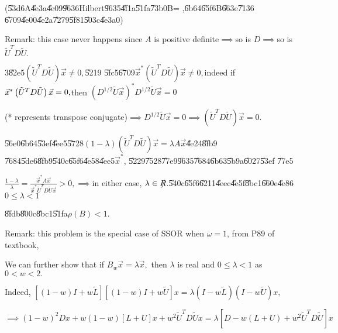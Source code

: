 \documentclass{article}
\begin{document}
(\U{53d6}A\U{4e3a}\U{4e09}\U{9636}Hilbert\U{9635}\U{4f1a}\U{51fa}\U{73b0}B=%
,\U{6b64}\U{65f6}B\U{663e}\U{7136}%
\U{6709}\U{4e00}\U{4e2a}\U{7279}\U{5f81}\U{503c}\U{4e3a}0)

Remark: this case never happens since $A$ is positive definite$\implies $so
is $D\implies $so is $\tilde{U}^{T}D\tilde{U}.$

3\U{82e5}$\left( \tilde{U}^{T}D\tilde{U}\right) \vec{x}\neq 0,$\U{5219}%
\U{5fc5}\U{6709}$\vec{x}^{\ast }\left( \tilde{U}^{T}D\tilde{U}\right) \vec{x}%
\neq 0,$indeed if $\vec{x}^{\ast }\left( \tilde{U}^{T}D\tilde{U}\right) \vec{%
x}=0,$then $\left( D^{1/2}\tilde{U}\vec{x}\right) ^{\ast }D^{1/2}\tilde{U}%
\vec{x}=0$

(* represents transpose conjugate)$\implies D^{1/2}\tilde{U}\vec{x}%
=0\implies \left( \tilde{U}^{T}D\tilde{U}\right) \vec{x}=0.$

\U{56e0}\U{6b64}\U{53ef}\U{4ee5}\U{5728}$\left( 1-\lambda \right) \left( 
\tilde{U}^{T}D\tilde{U}\right) \vec{x}=\lambda A\vec{x}$\U{4e24}\U{8fb9}%
\U{7684}\U{5de6}\U{8fb9}\U{540c}\U{65f6}\U{4e58}\U{4ee5}$\vec{x}^{\ast }$,%
\U{5229}\U{7528}\U{77e9}\U{9635}\U{7684}\U{6b63}\U{5b9a}\U{6027}\U{53ef}%
\U{77e5}

$\frac{1-\lambda }{\lambda }=\frac{\vec{x}^{\ast }A\vec{x}}{\vec{x}^{\ast }%
\tilde{U}^{T}D\tilde{U}\vec{x}}>0,\implies $in either case, $\lambda \in \NEG%
{R}$.\U{540c}\U{65f6}\U{6211}\U{4eec}\U{4e5f}\U{8bc1}\U{660e}\U{4e86}$0\leq
\lambda <1$

\U{8fdb}\U{800c}\U{8bc1}\U{51fa}$\rho \left( B\right) <1.$

Remark: this problem is the special case of SSOR when $\omega =1$, from P89
of textbook,

We can further show that if $B_{w}\vec{x}=\lambda \vec{x},$ then $\lambda $
is real and $0\leq \lambda <1$ as $0<w<2.$

Indeed, $\left[ \left( 1-w\right) I+w\tilde{L}\right] \left[ \left(
1-w\right) I+w\tilde{U}\right] x=\lambda \left( I-w\tilde{L}\right) \left(
I-w\tilde{U}\right) x,$

$\implies \left( 1-w\right) ^{2}Dx+w\left( 1-w\right) \left[ L+U\right]
x+w^{2}\tilde{U}^{T}D\tilde{U}x=\lambda \left[ D-w\left( L+U\right) +w^{2}%
\tilde{U}^{T}D\tilde{U}\right] x$
\end{document}
